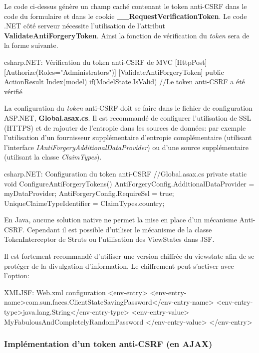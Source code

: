 Le code ci-dessus génère un champ caché contenant le token anti-CSRF dans le code du formulaire et dans le cookie \textbf{\_\_RequestVerificationToken}. Le code .NET côté serveur nécessite l'utilisation de l'attribut \textbf{ValidateAntiForgeryToken}. Ainsi la fonction de vérification du \textit{token} sera de la forme suivante.
\begin{Config}{csharp}{.NET: Vérification du token anti-CSRF de MVC}
[HttpPost]
[Authorize(Roles="Administrators")]
[ValidateAntiForgeryToken]
public ActionResult Index(model){
	if(ModelState.IsValid){
		//Le token anti-CSRF a été vérifié
	}
}
\end{Config}
La configuration du \textit{token} anti-CSRF doit se faire dans le fichier de configuration ASP.NET, \textbf{Global.asax.cs}. Il est recommandé de configurer l'utilisation de \gls{SSL} (\gls{HTTPS}) et de rajouter de l'entropie dans les sources de données: par exemple l'utilisation d'un fournisseur supplémentaire d'entropie complémentaire (utilisant l'interface \textit{IAntiForgeryAdditionalDataProvider}) ou d'une source supplémentaire (utilisant la classe \textit{ClaimTypes}).
\begin{Config}{csharp}{.NET: Configuration du token anti-CSRF}
//Global.asax.cs
private static void ConfigureAntiForgeryTokens(){
	AntiForgeryConfig.AdditionalDataProvider = myDataProvider;
	AntiForgeryConfig.RequireSsl = true;
	UniqueClaimeTypeIdentifier = ClaimTypes.country;
}
\end{Config}

En Java, aucune solution native ne permet la mise en place d'un mécanisme Anti-CSRF. Cependant il est possible d'utiliser le mécanisme de la classe TokenInterceptor de Struts ou l'utilisation des ViewStates dans JSF.

Il est fortement recommandé d'utiliser une version chiffrée du viewstate afin de se protéger de la divulgation d'information. Le chiffrement peut s'activer avec l'option:
\begin{Config}{XML}{JSF: Web.xml configuration}
<env-entry>
	<env-entry-name>com.sun.faces.ClientStateSavingPassword</env-entry-name>
	<env-entry-type>java.lang.String</env-entry-type>
	<env-entry-value>
		MyFabulousAndCompletelyRandomPassword
	</env-entry-value>
</env-entry>
\end{Config}


\subsubsection{Implémentation d'un token anti-CSRF (en AJAX)}

